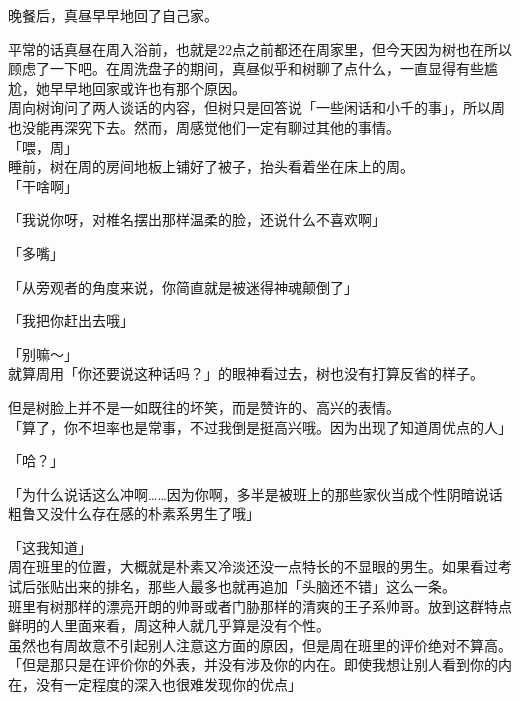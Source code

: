 \vspace{2\baselineskip}

晚餐后，真昼早早地回了自己家。

平常的话真昼在周入浴前，也就是22点之前都还在周家里，但今天因为树也在所以顾虑了一下吧。在周洗盘子的期间，真昼似乎和树聊了点什么，一直显得有些尴尬，她早早地回家或许也有那个原因。\\

周向树询问了两人谈话的内容，但树只是回答说「一些闲话和小千的事」，所以周也没能再深究下去。然而，周感觉他们一定有聊过其他的事情。\\

「喂，周」\\

睡前，树在周的房间地板上铺好了被子，抬头看着坐在床上的周。\\

「干啥啊」

「我说你呀，对椎名摆出那样温柔的脸，还说什么不喜欢啊」

「多嘴」

「从旁观者的角度来说，你简直就是被迷得神魂颠倒了」

「我把你赶出去哦」

「别嘛～」\\

就算周用「你还要说这种话吗？」的眼神看过去，树也没有打算反省的样子。

但是树脸上并不是一如既往的坏笑，而是赞许的、高兴的表情。\\

「算了，你不坦率也是常事，不过我倒是挺高兴哦。因为出现了知道周优点的人」

「哈？」

「为什么说话这么冲啊……因为你啊，多半是被班上的那些家伙当成个性阴暗说话粗鲁又没什么存在感的朴素系男生了哦」

「这我知道」\\

周在班里的位置，大概就是朴素又冷淡还没一点特长的不显眼的男生。如果看过考试后张贴出来的排名，那些人最多也就再追加「头脑还不错」这么一条。\\

班里有树那样的漂亮开朗的帅哥或者门胁那样的清爽的王子系帅哥。放到这群特点鲜明的人里面来看，周这种人就几乎算是没有个性。\\

虽然也有周故意不引起别人注意这方面的原因，但是周在班里的评价绝对不算高。\\

「但是那只是在评价你的外表，并没有涉及你的内在。即使我想让别人看到你的内在，没有一定程度的深入也很难发现你的优点」\\

